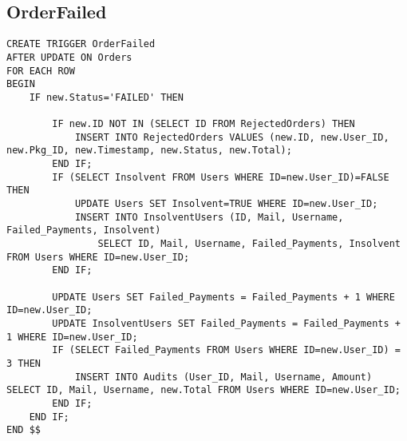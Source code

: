 \subsection{OrderFailed}

\begin{lstlisting}[style=SQL]
CREATE TRIGGER OrderFailed
AFTER UPDATE ON Orders
FOR EACH ROW
BEGIN
    IF new.Status='FAILED' THEN

        IF new.ID NOT IN (SELECT ID FROM RejectedOrders) THEN
            INSERT INTO RejectedOrders VALUES (new.ID, new.User_ID, new.Pkg_ID, new.Timestamp, new.Status, new.Total);
        END IF;
        IF (SELECT Insolvent FROM Users WHERE ID=new.User_ID)=FALSE THEN
            UPDATE Users SET Insolvent=TRUE WHERE ID=new.User_ID;
            INSERT INTO InsolventUsers (ID, Mail, Username, Failed_Payments, Insolvent)
                SELECT ID, Mail, Username, Failed_Payments, Insolvent FROM Users WHERE ID=new.User_ID;
        END IF;

        UPDATE Users SET Failed_Payments = Failed_Payments + 1 WHERE ID=new.User_ID;
        UPDATE InsolventUsers SET Failed_Payments = Failed_Payments + 1 WHERE ID=new.User_ID;
        IF (SELECT Failed_Payments FROM Users WHERE ID=new.User_ID) = 3 THEN
            INSERT INTO Audits (User_ID, Mail, Username, Amount) SELECT ID, Mail, Username, new.Total FROM Users WHERE ID=new.User_ID;
        END IF;
    END IF;
END $$
\end{lstlisting}



\blindtext
